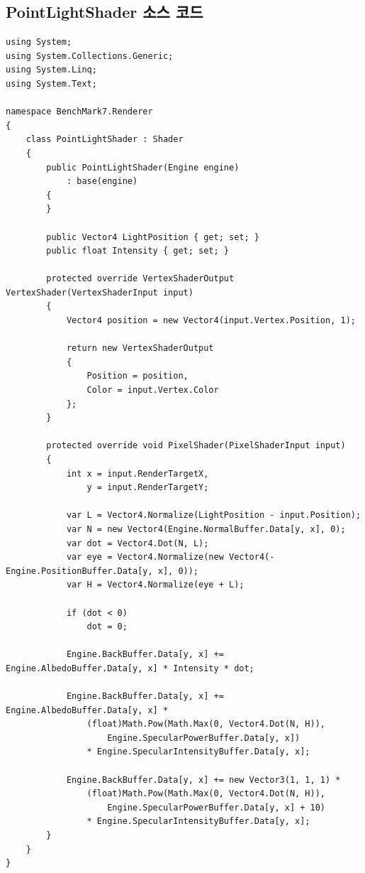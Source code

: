 \documentclass[a4paper,itemph,amsmath,oneside,11pt,openany]{xoblivoir}
\begin{document}
\subsection{PointLightShader 소스 코드}
\begin{verbatim}
using System;
using System.Collections.Generic;
using System.Linq;
using System.Text;

namespace BenchMark7.Renderer
{
    class PointLightShader : Shader
    {
        public PointLightShader(Engine engine)
            : base(engine)
        {
        }

        public Vector4 LightPosition { get; set; }
        public float Intensity { get; set; }

        protected override VertexShaderOutput VertexShader(VertexShaderInput input)
        {
            Vector4 position = new Vector4(input.Vertex.Position, 1);

            return new VertexShaderOutput
            {
                Position = position,
                Color = input.Vertex.Color
            };
        }

        protected override void PixelShader(PixelShaderInput input)
        {
            int x = input.RenderTargetX,
                y = input.RenderTargetY;

            var L = Vector4.Normalize(LightPosition - input.Position);
            var N = new Vector4(Engine.NormalBuffer.Data[y, x], 0);
            var dot = Vector4.Dot(N, L);
            var eye = Vector4.Normalize(new Vector4(-Engine.PositionBuffer.Data[y, x], 0));
            var H = Vector4.Normalize(eye + L);

            if (dot < 0)
                dot = 0;
            
            Engine.BackBuffer.Data[y, x] += Engine.AlbedoBuffer.Data[y, x] * Intensity * dot;
            
            Engine.BackBuffer.Data[y, x] += Engine.AlbedoBuffer.Data[y, x] *
                (float)Math.Pow(Math.Max(0, Vector4.Dot(N, H)),
                    Engine.SpecularPowerBuffer.Data[y, x])
                * Engine.SpecularIntensityBuffer.Data[y, x];
                        
            Engine.BackBuffer.Data[y, x] += new Vector3(1, 1, 1) *
                (float)Math.Pow(Math.Max(0, Vector4.Dot(N, H)),
                    Engine.SpecularPowerBuffer.Data[y, x] + 10)
                * Engine.SpecularIntensityBuffer.Data[y, x];
        }
    }
}
\end{verbatim}
\end{document}
